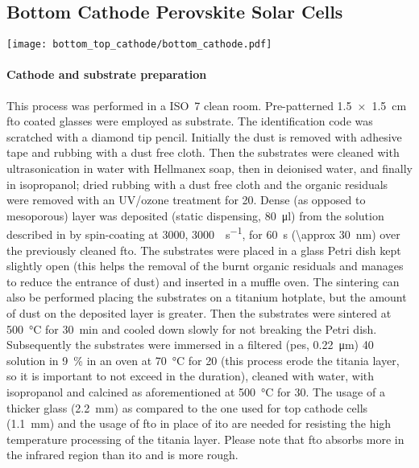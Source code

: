 		\FloatBarrier
	\subsection{Bottom Cathode Perovskite Solar Cells}\label{methods_bottom}

		\begin{SCfigure}
			\centering
			\texttt{[image: bottom\_top\_cathode/bottom\_cathode.pdf]}
			\label{fig:bottom_cathode}
		\end{SCfigure}

		\paragraph{Cathode and  substrate preparation}
		This process was performed in a ISO~7 clean room.
		Pre-patterned \SI{1.5 x 1.5}{\cm} \gls{fto} coated glasses were employed as substrate.
		The identification code was scratched with a diamond tip pencil.
		Initially the dust is removed with adhesive tape and rubbing with a dust free cloth.
		Then the substrates were cleaned with ultrasonication in water with Hellmanex soap, then in deionised water, and finally in isopropanol; dried rubbing with a dust free cloth and the organic residuals were removed with an UV/ozone treatment for \SI{20}{\min}.
		Dense (as opposed to mesoporous)  layer was deposited (static dispensing, \SI{80}{\ul}) from the solution described in  by spin-coating at \SI{3000}{\rpm}, \SI{3000}{\rpm\per\s}, for \SI{60}{\s} (\SI{\approx 30}{\nm}) over the previously cleaned \gls{fto}.
		The substrates were placed in a glass Petri dish kept slightly open (this helps the removal of the burnt organic residuals and manages to reduce the entrance of dust) and inserted in a muffle oven.
		The sintering can also be performed placing the substrates on a titanium hotplate, but the amount of dust on the deposited layer is greater.
		Then the substrates were sintered at \SI{500}{\celsius} for \SI{30}{\minute} and cooled down slowly for not breaking the Petri dish.
		Subsequently the substrates were immersed in a filtered (\gls{pes}, \SI{0.22}{\um}) \SI{40}{\milli\Molar}
		 solution in 9~\%  in an oven at \SI{70}{\celsius} for \SI{20}{\min} (this process erode the titania layer, so it is important to not exceed in the duration), cleaned with water, with isopropanol and calcined as aforementioned at \SI{500}{\celsius} for \SI{30}{\min}.
		The usage of a thicker glass (\SI{2.2}{\mm}) as compared to the one used for top cathode cells (\SI{1.1}{\mm}) and the usage of \gls{fto} in place of \gls{ito} are needed for resisting the high temperature processing of the titania layer.
		Please note that \gls{fto} absorbs more in the infrared region than \gls{ito} and is more rough.

